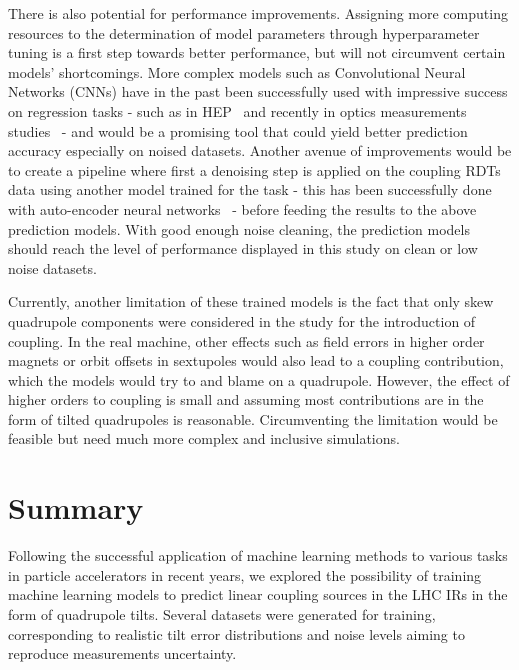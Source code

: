 There is also potential for performance improvements.
Assigning more computing resources to the determination of model parameters through hyperparameter tuning is a first step towards better performance, but will not circumvent certain models' shortcomings.
More complex models such as Convolutional Neural Networks (CNNs) have in the past been successfully used with impressive success on regression tasks - such as in \acrshort{HEP}~\cite{JOI:Aurisano:Convolutional_Neural_Network_Neutrino_Event_Classifier} and recently in optics measurements studies~\cite{IPAC:Fol:Optics_Corrections_Using_Machine_Learning_in_the_LHC} - and would be a promising tool that could yield better prediction accuracy especially on noised datasets.
Another avenue of improvements would be to create a pipeline where first a denoising step is applied on the coupling \glspl{RDT} data using another model trained for the task - this has been successfully done with auto-encoder neural networks~\cite{IPAC:Fol:Denoising_Optics_Measurements_Autoencoder_Neural_Networks} - before feeding the results to the above prediction models.
With good enough noise cleaning, the prediction models should reach the level of performance displayed in this study on clean or low noise datasets.

Currently, another limitation of these trained models is the fact that only \gls{skew} quadrupole components were considered in the study for the introduction of coupling.
In the real machine, other effects such as field errors in higher order magnets or orbit offsets in sextupoles would also lead to a coupling contribution, which the models would try to and blame on a quadrupole.
However, the effect of higher orders to coupling is small and assuming most contributions are in the form of tilted quadrupoles is reasonable.
Circumventing the limitation would be feasible but need much more complex and inclusive simulations.

\section{Summary}
\label{section:ml_conclusions_outlooks}

Following the successful application of machine learning methods to various tasks in particle accelerators in recent years, we explored the possibility of training machine learning models to predict linear coupling sources in the \gls{LHC} \glspl{IR} in the form of quadrupole tilts.
Several datasets were generated for training, corresponding to realistic tilt error distributions and noise levels aiming to reproduce measurements uncertainty.

